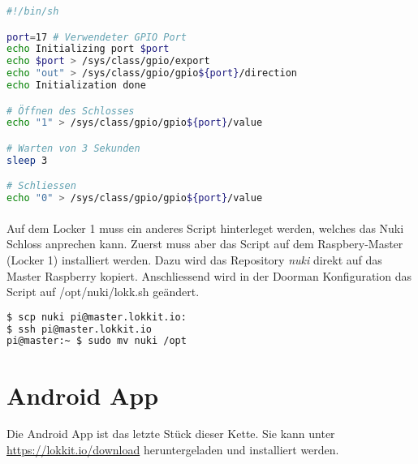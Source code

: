 \begin{lstlisting}[language=bash,caption={Script für Locker 2 und 3, das von Doorman aufgerufen wird}]
#!/bin/sh

port=17 # Verwendeter GPIO Port
echo Initializing port $port
echo $port > /sys/class/gpio/export
echo "out" > /sys/class/gpio/gpio${port}/direction
echo Initialization done

# Öffnen des Schlosses
echo "1" > /sys/class/gpio/gpio${port}/value

# Warten von 3 Sekunden
sleep 3

# Schliessen
echo "0" > /sys/class/gpio/gpio${port}/value
\end{lstlisting} 

\paragraph{}
Auf dem Locker 1 muss ein anderes Script hinterleget werden, welches das Nuki Schloss anprechen kann. Zuerst muss aber das Script auf dem Raspbery-Master (Locker 1) installiert werden. Dazu wird das Repository \emph{nuki} direkt auf das Master Raspberry kopiert. Anschliessend wird in der Doorman Konfiguration das Script auf /opt/nuki/lokk.sh geändert.

\begin{lstlisting}[language=bash]
$ scp nuki pi@master.lokkit.io:
$ ssh pi@master.lokkit.io
pi@master:~ $ sudo mv nuki /opt
\end{lstlisting}


\section{Android App}
Die Android App ist das letzte Stück dieser Kette. Sie kann unter \url{https://lokkit.io/download} heruntergeladen und installiert werden.